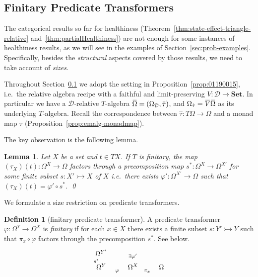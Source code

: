\documentclass[9pt, preprint]{sigplanconf}
\theoremstyle{theorem}
\newtheorem{lemma}[theorem]{Lemma}
\theoremstyle{definition}
\newtheorem{definition}[theorem]{Definition}
\newcommand{\cat}[1]{\mathcal{#1}}
\renewcommand{\bar}{\overbar}
\newcommand{\overbar}[1]{\mkern 1.5mu\overline{\mkern-1.5mu#1\mkern-1.5mu}\mkern 1.5mu}
\renewcommand{\phi}{\varphi}
\newcommand{\into}{\rightarrowtail}
\newcommand{\Set}{\mathbf{Set}}
\newcommand{\Sets}{\Set}
\newcommand{\OmegaD}{\Omega_{\cat{D}}}
\newcommand{\co}{\mathrel{\circ}}
\begin{document}
\subsection{Finitary Predicate Transformers}
\label{subs:example-finitary}
 The categorical results so far for healthiness
(Theorem~\ref{thm:state-effect-triangle-relative}
and~\ref{thm:partialHealthiness}) are not enough for some instances of
healthiness results, as we will see
 in the examples of Section~\ref{sec:prob-examples}. Specifically, besides
 the \emph{structural} aspects covered by those results, we need
 to take account of  \emph{sizes}.


Throughout  Section~\ref{subs:example-finitary} we adopt the setting in
Proposition~\ref{prop:01190015}, i.e.\ the relative algebra recipe
  with a faithful and limit-preserving $V\colon \cat{D}\to \Sets$.
In particular we have
a $\cat{D}$-relative $T$-algebra $\bar{\Omega} = (\OmegaD, \bar{\tau})$,
and  $\Omega_{\hat{\tau}} = \bar{V} \bar{\Omega}$ as its underlying
$T$-algebra. Recall the correspondence between $\hat{\tau}\colon
T\Omega\to \Omega$ and a monad map $\tau$ (Proposition~\ref{prop:emalg-monadmap}).



The key observation is the following lemma.
\begin{lemma}
  \label{lem:finitary-factorization}
  Let $X$ be a set and $t \in TX$.
  If $T$ is finitary, the map $(\tau_X)(t) \colon \Omega^{X} \to \Omega$
  factors through a precomposition map $s^* \colon \Omega^{X} \to \Omega^{X'}$
  for some \emph{finite} subset $s \colon X' \into X$ of $X$
  i.e.\ there exists $\phi' \colon \Omega^{X'} \to \Omega$
  such that $(\tau_X)(t) = \phi' \co s^*$.
 \qed
\end{lemma}


We formulate a size restriction on predicate transformers.
\begin{definition}[finitary predicate transformer]
 \label{def:finitaryPredTrasn}
  A predicate transformer $\phi \colon \Omega^Y \to \Omega^X$ is
 \emph{finitary}
  if for each $x \in X$ there exists a finite subset $s \colon Y' \into
 Y$
  such that $\pi_{x}\co \varphi$ factors through the precomposition
 $s^{*}$. See below.
\begin{equation}
    \vcenter{
    \xymatrix@R-2em{
      \Omega^{Y'} \ar@{->}[drr]^{\exists\phi'} \\
      \Omega^{Y} \ar[u]^{s^*} \ar[r]_{\phi}
      & \Omega^{X} \ar[r]_{\pi_x}
      & \Omega
    }
    }
  \end{equation}
\end{definition}
\end{document}
